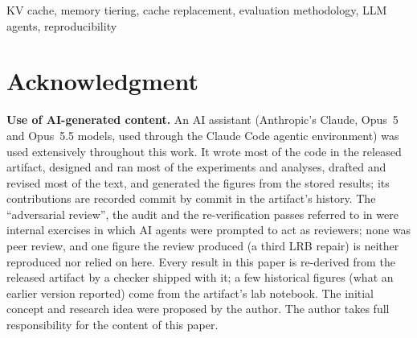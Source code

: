 \documentclass[conference]{IEEEtran}
\begin{document}
\begin{IEEEkeywords}
KV cache, memory tiering, cache replacement, evaluation methodology, LLM agents, reproducibility
\end{IEEEkeywords}










\section*{Acknowledgment}
\textbf{Use of AI-generated content.} An AI assistant (Anthropic's Claude, Opus~5 and Opus~5.5 models,
used through the Claude Code agentic environment) was used extensively throughout this work. It wrote
most of the code in the released artifact, designed and ran most of the experiments and analyses,
drafted and revised most of the text, and generated the figures from the stored results; its contributions are recorded commit by commit in
the artifact's history. The ``adversarial review'', the audit and the re-verification passes referred to in
 were internal exercises in which AI agents were prompted to act as reviewers; none
was peer review, and one
figure the review produced (a third LRB repair) is neither reproduced nor relied on here. Every result in this paper is
re-derived from the released artifact by a checker shipped with it; a few historical figures (what an
earlier version reported) come from the artifact's lab notebook. The initial concept and research
idea were proposed by the author. The author takes full responsibility for the content of this paper.



\end{document}
